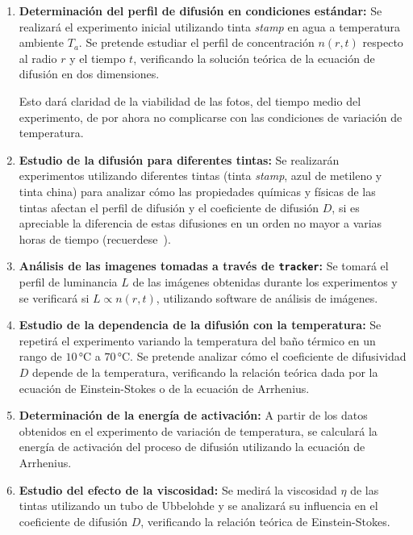 \documentclass[11pt]{article}
\begin{document}
\begin{enumerate}
    \item \textbf{Determinación del perfil de difusión en condiciones estándar:} 
    Se realizará el experimento inicial utilizando tinta \textit{stamp} en agua a temperatura ambiente $T_a$. Se pretende estudiar el perfil de concentración $n(r,t)$ respecto al radio $r$ y el tiempo $t$, verificando la solución teórica de la ecuación de difusión en dos dimensiones. 
    
    Esto dará claridad de la viabilidad de las fotos, del tiempo medio del experimento, de por ahora no complicarse con las condiciones de variación de temperatura.

    \item \textbf{Estudio de la difusión para diferentes tintas:} 
    Se realizarán experimentos utilizando diferentes tintas (tinta \textit{stamp}, azul de metileno y tinta china) para analizar cómo las propiedades químicas y físicas de las tintas afectan el perfil de difusión y el coeficiente de difusión $D$, si es apreciable la diferencia de estas difusiones en un orden no mayor a varias horas de tiempo (recuerdese~\cite{nirlRealDiffusionExperiment}).


    \item \textbf{Análisis de las imagenes tomadas a través de \texttt{tracker}:} 
    Se tomará el perfil de luminancia $L$ de las imágenes obtenidas durante los experimentos y se verificará si $L \propto n(r,t)$, utilizando software de análisis de imágenes.

    \item \textbf{Estudio de la dependencia de la difusión con la temperatura:} 
    Se repetirá el experimento variando la temperatura del baño térmico en un rango de $10 \, \unit{\degreeCelsius}$ a $70 \, \unit{\degreeCelsius}$. Se pretende analizar cómo el coeficiente de difusividad $D$ depende de la temperatura, verificando la relación teórica dada por la ecuación de Einstein-Stokes o de la ecuación de Arrhenius.

    \item \textbf{Determinación de la energía de activación:} 
    A partir de los datos obtenidos en el experimento de variación de temperatura, se calculará la energía de activación del proceso de difusión utilizando la ecuación de Arrhenius.

    \item \textbf{Estudio del efecto de la viscosidad:} 
    Se medirá la viscosidad $\eta$ de las tintas utilizando un tubo de Ubbelohde y se analizará su influencia en el coeficiente de difusión $D$, verificando la relación teórica de Einstein-Stokes.

\end{enumerate}
\end{document}
